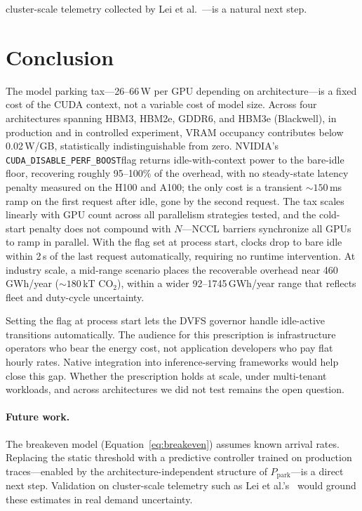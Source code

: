 \documentclass[sigconf,nonacm]{acmart}
\newcommand{\perfboost}{\texttt{CUDA\_\hspace{0pt}DISABLE\_\hspace{0pt}PERF\_\hspace{0pt}BOOST}}
\begin{document}
cluster-scale telemetry collected by Lei et al.~\cite{lei-idle}---is a natural next step.

\section{Conclusion}

The model parking tax---26--66\,W per GPU depending on architecture---is a fixed cost of the CUDA context, not a variable cost of model size. Across four architectures spanning HBM3, HBM2e, GDDR6, and HBM3e (Blackwell), in production and in controlled experiment, VRAM occupancy contributes below 0.02\,W/GB, statistically indistinguishable from zero. NVIDIA's \perfboost flag returns idle-with-context power to the bare-idle floor, recovering roughly 95--100\% of the overhead, with no steady-state latency penalty measured on the H100 and A100; the only cost is a transient ${\sim}150$\,ms ramp on the first request after idle, gone by the second request. The tax scales linearly with GPU count across all parallelism strategies tested, and the cold-start penalty does not compound with $N$---NCCL barriers synchronize all GPUs to ramp in parallel. With the flag set at process start, clocks drop to bare idle within 2\,s of the last request automatically, requiring no runtime intervention. At industry scale, a mid-range scenario places the recoverable overhead near \num{460}\,GWh/year (${\sim}180$\,kT CO$_2$), within a wider 92--\num{1745}\,GWh/year range that reflects fleet and duty-cycle uncertainty.

Setting the flag at process start lets the DVFS governor handle idle-active transitions automatically. The audience for this prescription is infrastructure operators who bear the energy cost, not application developers who pay flat hourly rates. Native integration into inference-serving frameworks would help close this gap. Whether the prescription holds at scale, under multi-tenant workloads, and across architectures we did not test remains the open question.

\paragraph{Future work.} The breakeven model (Equation~\ref{eq:breakeven}) assumes known arrival rates. Replacing the static threshold with a predictive controller trained on production traces---enabled by the architecture-independent structure of $P_{\text{park}}$---is a direct next step. Validation on cluster-scale telemetry such as Lei et al.'s~\cite{lei-idle} would ground these estimates in real demand uncertainty.
\end{document}
